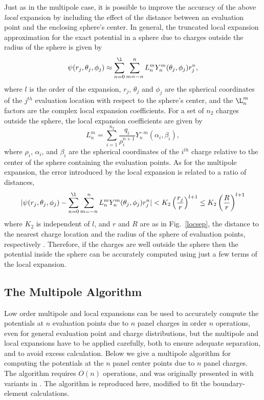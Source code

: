 Just as in the multipole case, it is possible to improve the
accuracy of the above {\em local} expansion by including the effect of
the distance between an evaluation point and the enclosing
sphere's center.  In general, the truncated local expansion 
approximation for the exact potential
in a sphere due to  charges outside the radius of the sphere is
given by 
\begin{equation}
\psi(r_j, \theta_j , \phi_j ) \approx \sum_{n=0}^{\l} \sum_{m=-n}^{n}
L^m_n  Y^m_n(\theta_j , \phi_j ) r_j^{n},
\label{eq:local}
\end{equation}
where $ l $ is the order of the expansion,
$ r_j $, $\theta_j $ and $ \phi_j $ are the spherical coordinates of
the $j^{th}$ evaluation location with respect to the sphere's center, 
and the $\L^m_n $ factors are the complex local expansion coefficients.  
For a set of $ n_2 $ charges
outside the sphere, the local expansion coefficients are given by
\begin{equation}
L^m_n = \sum_{i=1}^{n_2} \frac{q_i}{\rho^{n+1}_i} Y^{-m}_n(\alpha_i, \beta_i),
\end{equation}
where $ \rho_i $, $ \alpha_i $, and $ \beta_i $ are the spherical
coordinates of the $ i^{th} $ charge relative to the center of the
sphere containing the evaluation points.
As for the multipole expansion, the error 
introduced  by the local expansion is related to a ratio of distances,
\begin{equation}
| \psi(r_j, \theta_j , \phi_j ) - \sum_{n=0}^{\l} \sum_{m=-n}^{n}
L^m_n  Y^m_n(\theta_j , \phi_j ) r_j^{n} | < K_2
\left( \frac{r_j}{r} \right)^{l+1} \leq K_2 \left( \frac{R}{r} \right)^{l+1}
\end{equation}
where
$ K_2 $ is independent of $l$, and 
$r$ and
$ R $ are as in Fig.~\ref{locsep},
the distance to the nearest
charge location and the
radius of the sphere of evaluation points, respectively \cite{gre}.
Therefore, if the charges are well outside the sphere then
the potential inside the sphere can be accurately computed using just a few
terms of the local expansion.

\subsection{The Multipole Algorithm}

Low order multipole and local expansions can be used to accurately compute
the potentials at $ n $ evaluation points due to $ n $ panel charges in
order $ n $ operations, even for general evaluation point and charge 
distributions, but the multipole and local expansions have to be
applied carefully, both to ensure adequate separation, and to avoid excess
calculation.  Below we give a multipole algorithm for computing the
potentials at the $ n $ panel center points due to $ n $ panel charges.  The
algorithm requires $ O(n) $ operations, and was originally presented in
\cite{gre} with variants in \cite{roh,kat,zha}.  The algorithm is reproduced
here, modified to fit the boundary-element  calculations.

